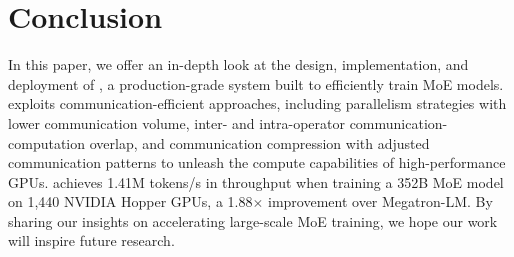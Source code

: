 \section{Conclusion}
\label{sec:conclusion}

In this paper, we offer an in-depth look at the design, implementation, and deployment of \sysname, a production-grade system built to efficiently train MoE models. \sysname exploits communication-efficient approaches, including parallelism strategies with lower communication volume, inter- and intra-operator communication-computation overlap, and communication compression with adjusted communication patterns to unleash the compute capabilities of high-performance GPUs. \sysname achieves 1.41M tokens/s in throughput when training a 352B MoE model on 1,440 NVIDIA Hopper GPUs, a 1.88$\times$ improvement over Megatron-LM. By sharing our insights on accelerating large-scale MoE training, we hope our work will inspire future research.


